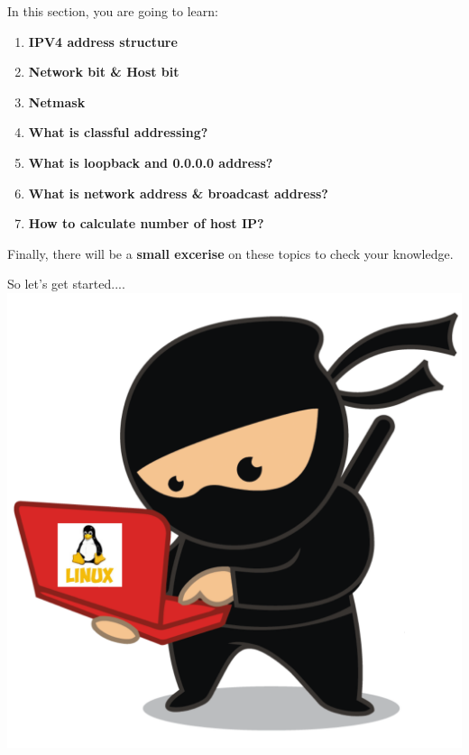 \setlength{\columnsep}{3pt}
\begin{flushleft}
	\bigskip
	\bigskip
	\begin{tcolorbox}[breakable,notitle,boxrule=1pt,colback=black,colframe=black]
		\color{white}
		\bigskip
		In this section, you are going to learn:
		\begin{enumerate}
			\item \textbf{IPV4 address structure}
			\item \textbf{Network bit \& Host bit}
			\item \textbf{Netmask}
			\item \textbf{What is classful addressing?}
			\item \textbf{What is loopback and 0.0.0.0 address?}
			\item \textbf{What is network address \& broadcast address?}
			\item \textbf{How to calculate number of host IP?}
		\end{enumerate}	
		\bigskip
		Finally, there will be a \textbf{small excerise} on these topics to check your knowledge.
		\bigskip
	\end{tcolorbox}
	
	
	\begin{multicols}{2}
		\vspace*{\fill}
		\vspace*{\fill}
		\vspace*{\fill}
		\vspace*{\fill}
		\vspace*{\fill}
		\vspace*{\fill}
		\vspace*{\fill}
		\vspace*{\fill}
		\vspace*{\fill}
		
		\vfill \null
		\columnbreak
		So let's get started....
		\includegraphics[scale=0.08]{content/linux_section.png}
	\end{multicols}	
	
\end{flushleft}

\newpage

